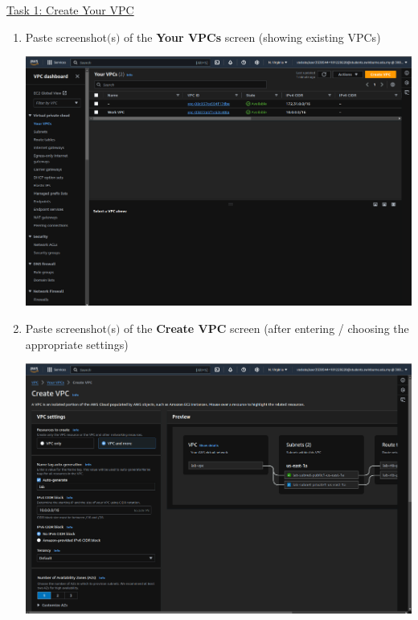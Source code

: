 \documentclass[11pt]{article}
\begin{document}
\vspace{1.5cm}

\newpage

\noindent\underline{Task 1: Create Your VPC}

\begin{enumerate}
    \item Paste screenshot$($s$)$ of the \textbf{Your VPCs} screen (showing existing VPCs) \\
    \vspace{5mm}
    
    
    {\centering
    \includegraphics[width=5.8in]{pics/1.png}
    }
    
    \item Paste screenshot$($s$)$ of the \textbf{Create VPC} screen (after entering / choosing the appropriate settings) \\
    \vspace{5mm}

    {\centering
    \includegraphics[width=5.8in]{pics/2_a.png}
    }


\end{enumerate}
\end{document}
